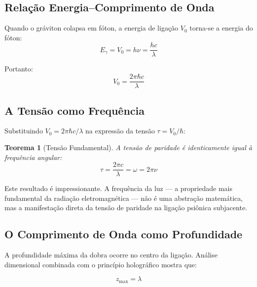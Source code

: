 \documentclass[12pt,a4paper,twoside]{article}
\newtheorem{theorem}{Teorema}[section]
\begin{document}
\subsection{Rela\c{c}\~ao Energia--Comprimento de Onda}

Quando o gr\'aviton colapsa em f\'oton, a energia de liga\c{c}\~ao $V_0$ torna-se a energia do f\'oton:
\begin{equation}
E_\gamma = V_0 = h\nu = \frac{hc}{\lambda}
\label{eq:foton_energia}
\end{equation}

Portanto:
\begin{equation}
V_0 = \frac{2\pi\hbar c}{\lambda}
\label{eq:V0_lambda}
\end{equation}

\subsection{A Tens\~ao como Frequ\^encia}

Substituindo $V_0 = 2\pi\hbar c/\lambda$ na express\~ao da tens\~ao $\tau = V_0/\hbar$:

\begin{resultbox}[title={Teorema 3 --- Tens\~ao Fundamental}]
\begin{theorem}[Tens\~ao Fundamental]\label{thm:tensao}
A tens\~ao de paridade \'e identicamente igual \`a frequ\^encia angular:
\begin{equation}
\boxed{\tau = \frac{2\pi c}{\lambda} = \omega = 2\pi\nu}
\label{eq:tensao_fundamental}
\end{equation}
\end{theorem}
\end{resultbox}

\noindent Este resultado \'e impressionante. A frequ\^encia da luz --- a propriedade mais fundamental da radia\c{c}\~ao eletromagn\'etica --- n\~ao \'e uma abstra\c{c}\~ao matem\'atica, mas a manifesta\c{c}\~ao direta da tens\~ao de paridade na liga\c{c}\~ao psi\^onica subjacente.

\subsection{O Comprimento de Onda como Profundidade}

A profundidade m\'axima da dobra ocorre no centro da liga\c{c}\~ao. An\'alise dimensional combinada com o princ\'ipio hologr\'afico mostra que:

\begin{equationbox}[title={Identidade Profundidade--Comprimento de Onda}]
\begin{equation}
\boxed{z_{\max} = \lambda}
\label{eq:zmax_lambda}
\end{equation}
\end{equationbox}
\end{document}
